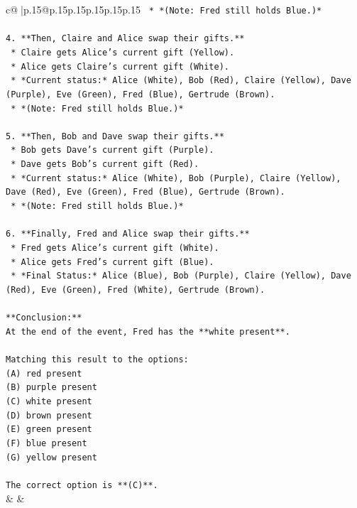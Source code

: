 \documentclass{article}
\begin{document}
{\begin{supertabular}{c@{$\;$}|p{.15\linewidth}@{}p{.15\linewidth}p{.15\linewidth}p{.15\linewidth}p{.15\linewidth}p{.15\linewidth}}
{{{\texttt{    *   *(Note: Fred still holds Blue.)*} \\
\\ 
\texttt{4.  **Then, Claire and Alice swap their gifts.**} \\
\texttt{    *   Claire gets Alice's current gift (Yellow).} \\
\texttt{    *   Alice gets Claire's current gift (White).} \\
\texttt{    *   *Current status:* Alice (White), Bob (Red), Claire (Yellow), Dave (Purple), Eve (Green), Fred (Blue), Gertrude (Brown).} \\
\texttt{    *   *(Note: Fred still holds Blue.)*} \\
\\ 
\texttt{5.  **Then, Bob and Dave swap their gifts.**} \\
\texttt{    *   Bob gets Dave's current gift (Purple).} \\
\texttt{    *   Dave gets Bob's current gift (Red).} \\
\texttt{    *   *Current status:* Alice (White), Bob (Purple), Claire (Yellow), Dave (Red), Eve (Green), Fred (Blue), Gertrude (Brown).} \\
\texttt{    *   *(Note: Fred still holds Blue.)*} \\
\\ 
\texttt{6.  **Finally, Fred and Alice swap their gifts.**} \\
\texttt{    *   Fred gets Alice's current gift (White).} \\
\texttt{    *   Alice gets Fred's current gift (Blue).} \\
\texttt{    *   *Final Status:* Alice (Blue), Bob (Purple), Claire (Yellow), Dave (Red), Eve (Green), Fred (White), Gertrude (Brown).} \\
\\ 
\texttt{**Conclusion:**} \\
\texttt{At the end of the event, Fred has the **white present**.} \\
\\ 
\texttt{Matching this result to the options:} \\
\texttt{(A) red present} \\
\texttt{(B) purple present} \\
\texttt{(C) white present} \\
\texttt{(D) brown present} \\
\texttt{(E) green present} \\
\texttt{(F) blue present} \\
\texttt{(G) yellow present} \\
\\ 
\texttt{The correct option is **(C)**.} \\
            }
        }
    }
    & & \\ \\


\end{supertabular}}
\end{document}
